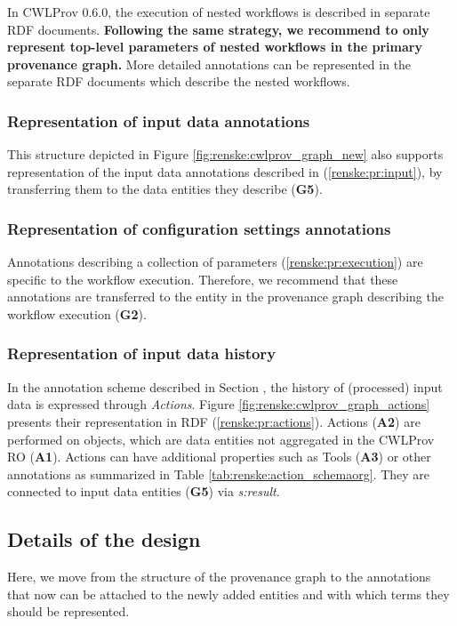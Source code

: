 In CWLProv 0.6.0, the execution of nested workflows is described in separate RDF documents. \textbf{Following the same strategy, we recommend to only represent top-level parameters of nested workflows in the primary provenance graph.} More detailed annotations can be represented in the separate RDF documents which describe the nested workflows.

\subsubsection{Representation of input data annotations}
This structure depicted in Figure \ref{fig:renske:cwlprov_graph_new} also supports representation of the input data annotations described in \emph{} (\ref{renske:pr:input}), by transferring them to the data entities they describe (\textbf{G5}). 


\subsubsection{Representation of configuration settings annotations} Annotations describing a collection of parameters (\ref{renske:pr:execution}) are specific to the workflow execution. Therefore, we recommend that these annotations are transferred to the entity in the provenance graph describing the workflow execution (\textbf{G2}).

\subsubsection{Representation of input data history}
In the annotation scheme described in Section \emph{}, the history of (processed) input data is expressed through \emph{Actions}. Figure \ref{fig:renske:cwlprov_graph_actions} presents their representation in RDF (\ref{renske:pr:actions}). 
Actions (\textbf{A2}) are performed on objects, which are data entities not aggregated in the CWLProv RO (\textbf{A1}). Actions can have additional properties such as Tools (\textbf{A3}) or other annotations as summarized in Table \ref{tab:renske:action_schemaorg}. They are connected to input data entities (\textbf{G5}) via \emph{s:result}.

\subsection{Details of the design}
\label{sec:renske:ext_details}
Here, we move from the structure of the provenance graph to the annotations that now can be attached to the newly added entities and with which terms they should be represented.

